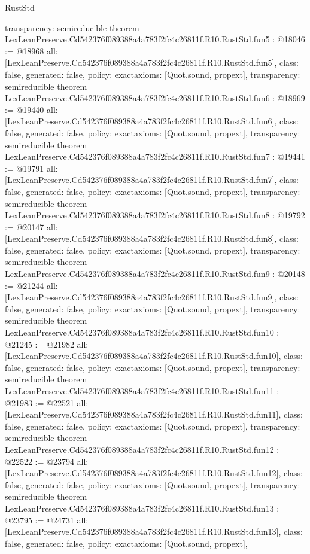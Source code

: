 \begin{lexlean}{RustStd}
\begin{coremodule}
{  transparency: semireducible
}
theorem LexLeanPreserve.Cd542376f089388a4a783f2fc4c26811f.R10.RustStd.fun5 : @18046 := @18968 {
  all: [LexLeanPreserve.Cd542376f089388a4a783f2fc4c26811f.R10.RustStd.fun5],
  class: false,
  generated: false,
  policy: exact{axioms: [Quot.sound, propext]},
  transparency: semireducible
}
theorem LexLeanPreserve.Cd542376f089388a4a783f2fc4c26811f.R10.RustStd.fun6 : @18969 := @19440 {
  all: [LexLeanPreserve.Cd542376f089388a4a783f2fc4c26811f.R10.RustStd.fun6],
  class: false,
  generated: false,
  policy: exact{axioms: [Quot.sound, propext]},
  transparency: semireducible
}
theorem LexLeanPreserve.Cd542376f089388a4a783f2fc4c26811f.R10.RustStd.fun7 : @19441 := @19791 {
  all: [LexLeanPreserve.Cd542376f089388a4a783f2fc4c26811f.R10.RustStd.fun7],
  class: false,
  generated: false,
  policy: exact{axioms: [Quot.sound, propext]},
  transparency: semireducible
}
theorem LexLeanPreserve.Cd542376f089388a4a783f2fc4c26811f.R10.RustStd.fun8 : @19792 := @20147 {
  all: [LexLeanPreserve.Cd542376f089388a4a783f2fc4c26811f.R10.RustStd.fun8],
  class: false,
  generated: false,
  policy: exact{axioms: [Quot.sound, propext]},
  transparency: semireducible
}
theorem LexLeanPreserve.Cd542376f089388a4a783f2fc4c26811f.R10.RustStd.fun9 : @20148 := @21244 {
  all: [LexLeanPreserve.Cd542376f089388a4a783f2fc4c26811f.R10.RustStd.fun9],
  class: false,
  generated: false,
  policy: exact{axioms: [Quot.sound, propext]},
  transparency: semireducible
}
theorem LexLeanPreserve.Cd542376f089388a4a783f2fc4c26811f.R10.RustStd.fun10 : @21245 := @21982 {
  all: [LexLeanPreserve.Cd542376f089388a4a783f2fc4c26811f.R10.RustStd.fun10],
  class: false,
  generated: false,
  policy: exact{axioms: [Quot.sound, propext]},
  transparency: semireducible
}
theorem LexLeanPreserve.Cd542376f089388a4a783f2fc4c26811f.R10.RustStd.fun11 : @21983 := @22521 {
  all: [LexLeanPreserve.Cd542376f089388a4a783f2fc4c26811f.R10.RustStd.fun11],
  class: false,
  generated: false,
  policy: exact{axioms: [Quot.sound, propext]},
  transparency: semireducible
}
theorem LexLeanPreserve.Cd542376f089388a4a783f2fc4c26811f.R10.RustStd.fun12 : @22522 := @23794 {
  all: [LexLeanPreserve.Cd542376f089388a4a783f2fc4c26811f.R10.RustStd.fun12],
  class: false,
  generated: false,
  policy: exact{axioms: [Quot.sound, propext]},
  transparency: semireducible
}
theorem LexLeanPreserve.Cd542376f089388a4a783f2fc4c26811f.R10.RustStd.fun13 : @23795 := @24731 {
  all: [LexLeanPreserve.Cd542376f089388a4a783f2fc4c26811f.R10.RustStd.fun13],
  class: false,
  generated: false,
  policy: exact{axioms: [Quot.sound, propext]},
}
\end{coremodule}
\end{lexlean}
